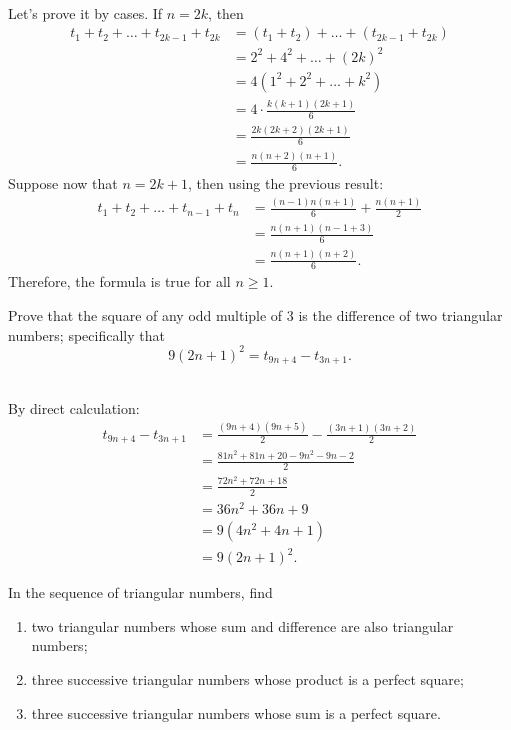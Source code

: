 \begin{solution}
    \\ Let's prove it by cases. If $n = 2k$, then
    \begin{align*}
        t_1 + t_2 + \dots + t_{2k-1} + t_{2k} &= (t_1 + t_2) + \dots + (t_{2k-1} + t_{2k}) \\
        &= 2^2 + 4^2 + \dots + (2k)^2 \\
        &= 4(1^2 + 2^2 + \dots + k^2) \\
        &= 4\cdot \frac{k(k+1)(2k+1)}{6} \\
        &= \frac{2k(2k+2)(2k+1)}{6} \\
        &= \frac{n(n+2)(n+1)}{6}.
    \end{align*}
    Suppose now that $n = 2k+1$, then using the previous result:
    \begin{align*}
        t_1 + t_2 + \dots + t_{n-1} + t_{n} &= \frac{(n-1)n(n+1)}{6} + \frac{n(n+1)}{2} \\
        &= \frac{n(n+1)(n-1 + 3)}{6} \\
        &= \frac{n(n+1)(n+2)}{6}.
    \end{align*}
    Therefore, the formula is true for all $n \geq 1$. \\
\end{solution}

\begin{exercise}
    Prove that the square of any odd multiple of 3 is the difference of two triangular numbers; specifically that
    $$9(2n+1)^2 = t_{9n+4} - t_{3n+1}.$$
\end{exercise}

\begin{solution}
    \\ By direct calculation:
    \begin{align*}
        t_{9n+4} - t_{3n+1} &= \frac{(9n+4)(9n+5)}{2} - \frac{(3n+1)(3n+2)}{2} \\
        &= \frac{81n^2 + 81n + 20 - 9n^2 - 9n - 2}{2} \\
        &= \frac{72n^2 + 72n + 18}{2} \\
        &= 36n^2 + 36n + 9 \\
        &= 9(4n^2 + 4n + 1) \\
        &= 9(2n+1)^2.
    \end{align*}
\end{solution}

\begin{exercise}
    In the sequence of triangular numbers, find
    \begin{enumerate}
        \item two triangular numbers whose sum and difference are also triangular numbers;
        \item three successive triangular numbers whose product is a perfect square;
        \item three successive triangular numbers whose sum is a perfect square.
    \end{enumerate}
\end{exercise}

